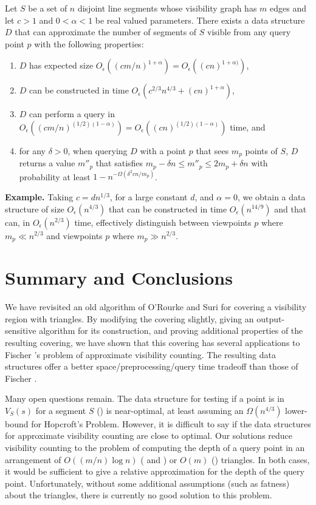 \documentclass{patmorin}
\newcommand{\Oe}{O_\epsilon}
\begin{document}
\begin{thm}
  Let $S$ be a set of $n$ disjoint line segments whose visibility
  graph has $m$ edges and let $c>1$ and $0 < \alpha < 1$ be real valued
  parameters.  There exists a data structure $D$ that can approximate
  the number of segments of $S$ visible from any query point $p$ with
  the following properties:
  \begin{enumerate}
    \item $D$ has expected size $\Oe((cm/n)^{1+\alpha}) =
          \Oe((cn)^{1+\alpha)})$,
    \item $D$ can be constructed in time
          $\Oe(c^{2/3}n^{4/3} + (cn)^{1+\alpha})$,
    \item $D$ can perform a query in $\Oe((cm/n)^{(1/2)(1-\alpha)}) =
          \Oe((cn)^{(1/2)(1-\alpha)})$ time, and
    \item for any $\delta > 0$, when querying $D$ with a point $p$
          that sees $m_p$ points of $S$, $D$ returns a value $m''_p$
          that satisfies $m_p - \delta n \le m''_p \le 2m_p + \delta n$
          with probability at least $1-n^{-\Omega(\delta^2 cn/m_p)}$.
  \end{enumerate}
\end{thm}

\noindent\textbf{Example.}  Taking $c=dn^{1/3}$, for a large constant $d$,
and $\alpha=0$, we obtain a data structure of size $\Oe(n^{4/3})$ that can
be constructed in time $\Oe(n^{14/9})$ and that can, in $\Oe(n^{2/3})$
time, effectively distinguish between viewpoints $p$ where $m_p \ll
n^{2/3}$ and viewpoints $p$ where $m_p \gg n^{2/3}$.

\section{Summary and Conclusions}

We have revisited an old algorithm of O'Rourke and Suri for covering a
visibility region with triangles.  By modifying the covering slightly,
giving an output-sensitive algorithm for its construction, and proving
additional properties of the resulting covering, we have shown that
this covering has several applications to Fischer \etal's problem of
approximate visibility counting.  The resulting data structures offer
a better space/preprocessing/query time tradeoff than those of Fischer
\etal.

Many open questions remain.  The data structure for testing if a point is
in $V_S(s)$ for a segment $S$ () is near-optimal, at
least assuming an $\Omega(n^{4/3})$ lower-bound for Hopcroft's Problem.
However, it is difficult to say if the data structures for approximate
visibility counting are close to optimal.  Our solutions reduce visibility
counting to the problem of computing the depth of a query point in an
arrangement of $O((m/n)\log n)$ ( and
) or $O(m)$ () triangles.  In both
cases, it would be sufficient to give a relative approximation for the
depth of the query point.  Unfortunately, without some additional
assumptions (such as fatness) about the triangles, there is currently no
good solution to this problem.
\end{document}
